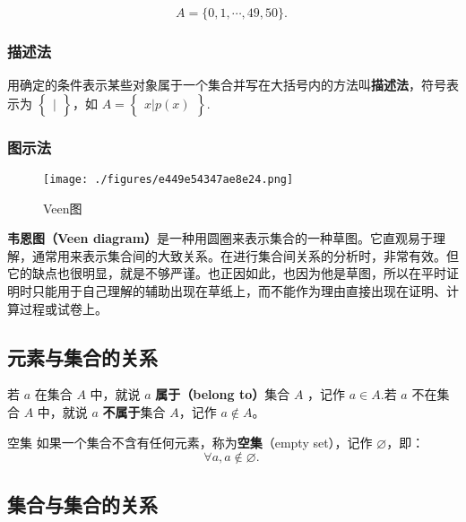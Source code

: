 \begin{equation}
A=\{0,1, \cdots ,49,50\}.~
\end{equation}


\subsubsection{描述法}

用确定的条件表示某些对象属于一个集合并写在大括号内的方法叫\textbf{描述法}，符号表示为 $\begin{Bmatrix} | \end{Bmatrix}$，如 $A=\begin{Bmatrix} x|p(x) \end{Bmatrix}$.

\subsubsection{图示法}

\begin{figure}[ht]
\centering
\texttt{[image: ./figures/e449e54347ae8e24.png]}
\caption{Veen图} \label{fig_SufCnd_1}
\end{figure}

\textbf{韦恩图（Veen diagram）}是一种用圆圈来表示集合的一种草图。它直观易于理解，通常用来表示集合间的大致关系。在进行集合间关系的分析时，非常有效。但它的缺点也很明显，就是不够严谨。也正因如此，也因为他是草图，所以在平时证明时只能用于自己理解的辅助出现在草纸上，而不能作为理由直接出现在证明、计算过程或试卷上。


\subsection{元素与集合的关系}

若 $a$ 在集合 $A$ 中，就说 $a$ \textbf{属于（belong to）}集合 $A$ ，记作 $a \in A$.若 $a$ 不在集合 $A$ 中，就说 $a$ \textbf{不属于}集合 $A$，记作 $a\notin A$。


\begin{definition}{空集}
如果一个集合不含有任何元素，称为\textbf{空集}（empty set），记作 $\varnothing$，即：
\begin{equation}
\forall a,a\notin\varnothing.~
\end{equation}

\end{definition}

\subsection{集合与集合的关系}

